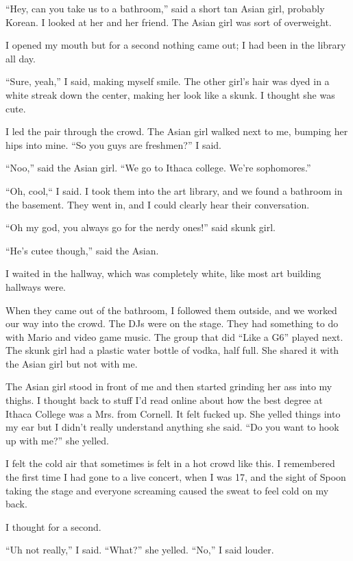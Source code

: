 ``Hey, can you take us to a bathroom,'' said a short tan Asian girl, probably
Korean.  I looked at her and her friend.  The Asian girl was sort of overweight.

I opened my mouth but for a second nothing came out; I had been in the library
all day.

``Sure, yeah,'' I said, making myself smile.  The other girl's hair was dyed in
a white streak down the center, making her look like a skunk.  I thought she
was cute.

I led the pair through the crowd.  The Asian girl walked next to me, bumping
her hips into mine. ``So you guys are freshmen?'' I said.  

``Noo,'' said the Asian girl.  ``We go to Ithaca college.  We're sophomores.''

``Oh, cool,`` I said.   I took them into the art library, and we found a
bathroom in the basement.  They went in, and I could clearly hear their
conversation.

``Oh my god, you always go for the nerdy ones!'' said skunk girl.

``He's cutee though,'' said the Asian. 

I waited in the hallway, which was completely white, like most art building
hallways were.

When they came out of the bathroom, I followed them outside, and we worked our
way into the crowd.  The DJs were on the stage.  They had something to do with
Mario and video game music.  The group that did ``Like a G6'' played next.  The
skunk girl had a plastic water bottle of vodka, half full.  She shared it with
the Asian girl but not with me.

The Asian girl stood in front of me and then started grinding her ass into my
thighs.  I thought back to stuff I'd read online about how the best degree at
Ithaca College was a Mrs. from Cornell.  It felt fucked up.  She yelled things
into my ear but I didn't really understand anything she said.  ``Do you want to
hook up with me?'' she yelled.  

I felt the cold air that sometimes is felt in a hot crowd like this.  I
remembered the first time I had gone to a live concert, when I was 17, and the
sight of Spoon taking the stage and everyone screaming caused the sweat to feel
cold on my back.

I thought for a second.

``Uh not really,'' I said.  ``What?'' she yelled.  ``No,'' I said louder.


